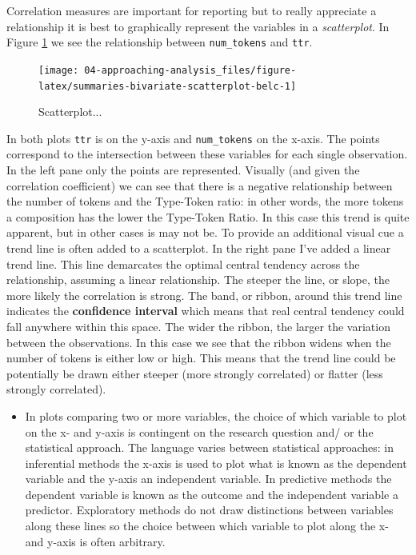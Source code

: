 \documentclass[
]{article}
\newenvironment{rmdblock}[1]
  {\begin{shaded*}
  \begin{itemize}
  \renewcommand{\labelitemi}{
    \raisebox{-.5\height}[0pt][0pt]{
      {\setkeys{Gin}{width=2em,keepaspectratio}\texttt{[image: assets/images/\#1]}}
    }
  }
  \item
  }
  {
  \end{itemize}
  \end{shaded*}
  }
\newenvironment{rmdtip}
  {\begin{rmdblock}{tip}}
  {\end{rmdblock}}
\begin{document}
Correlation measures are important for reporting but to really appreciate a relationship it is best to graphically represent the variables in a \emph{scatterplot}. In Figure \ref{fig:summaries-bivariate-scatterplot-belc} we see the relationship between \texttt{num\_tokens} and \texttt{ttr}.

\begin{figure}

{\centering \texttt{[image: 04-approaching-analysis\_files/figure-latex/summaries-bivariate-scatterplot-belc-1]} 

}

\caption{Scatterplot...}\label{fig:summaries-bivariate-scatterplot-belc}
\end{figure}

In both plots \texttt{ttr} is on the y-axis and \texttt{num\_tokens} on the x-axis. The points correspond to the intersection between these variables for each single observation. In the left pane only the points are represented. Visually (and given the correlation coefficient) we can see that there is a negative relationship between the number of tokens and the Type-Token ratio: in other words, the more tokens a composition has the lower the Type-Token Ratio. In this case this trend is quite apparent, but in other cases is may not be. To provide an additional visual cue a trend line is often added to a scatterplot. In the right pane I've added a linear trend line. This line demarcates the optimal central tendency across the relationship, assuming a linear relationship. The steeper the line, or slope, the more likely the correlation is strong. The band, or ribbon, around this trend line indicates the \textbf{confidence interval} which means that real central tendency could fall anywhere within this space. The wider the ribbon, the larger the variation between the observations. In this case we see that the ribbon widens when the number of tokens is either low or high. This means that the trend line could be potentially be drawn either steeper (more strongly correlated) or flatter (less strongly correlated).

\begin{rmdtip}
In plots comparing two or more variables, the choice of which variable
to plot on the x- and y-axis is contingent on the research question and/
or the statistical approach. The language varies between statistical
approaches: in inferential methods the x-axis is used to plot what is
known as the dependent variable and the y-axis an independent variable.
In predictive methods the dependent variable is known as the outcome and
the independent variable a predictor. Exploratory methods do not draw
distinctions between variables along these lines so the choice between
which variable to plot along the x- and y-axis is often arbitrary.
\end{rmdtip}
\end{document}
